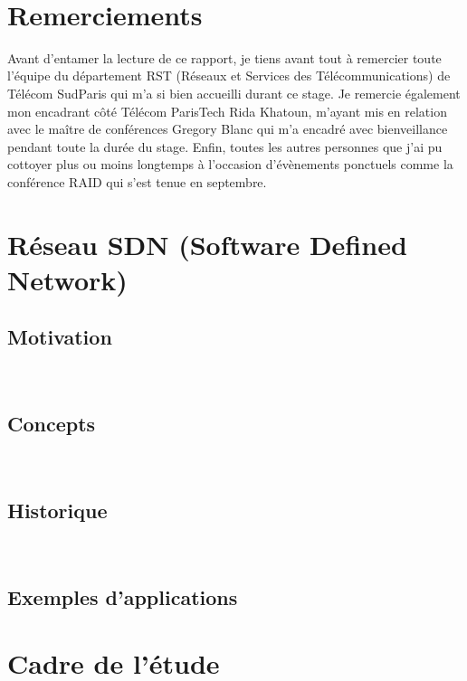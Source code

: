 \documentclass[a4paper]{article}
\begin{document}
\newcommand{\HRule}{\rule{\linewidth}{0.5mm}}



\newpage
~
\section*{\Huge{Remerciements\\}}
\Large Avant d'entamer la lecture de ce rapport, je tiens avant tout à remercier toute l'équipe du département RST (Réseaux et Services des Télécommunications) de Télécom SudParis qui m'a si bien accueilli durant ce stage. Je remercie également mon encadrant côté Télécom ParisTech Rida Khatoun, m'ayant mis en relation avec le maître de conférences Gregory Blanc qui m'a encadré avec bienveillance pendant toute la durée du stage. Enfin, toutes les autres personnes que j'ai pu cottoyer plus ou moins longtemps à l'occasion d'évènements ponctuels comme la conférence RAID qui s'est tenue en septembre.


\newpage
\tableofcontents


\newpage
{}
\section{Réseau SDN (Software Defined Network)}
	\subsection{Motivation}
		
		~\\
	\subsection{Concepts}
		
		~\\
	\subsection{Historique}
		
		~\\
	\subsection{Exemples d'applications}
\section{Cadre de l'étude}
\end{document}
